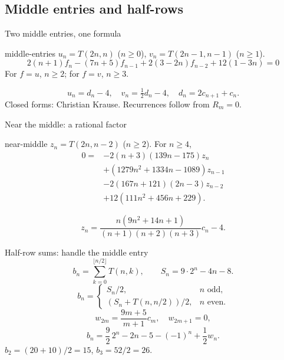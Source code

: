\documentclass{beamer}
\begin{document}
\subsection{Middle entries and half-rows}
\begin{frame}{Two middle entries, one formula}
\small
\begin{bookresult}{middle-entries}
$u_n=T(2n,n)$ ($n\ge0$), $v_n=T(2n-1,n-1)$ ($n\ge1$).
\[
2(n+1)f_n-(7n+5)f_{n-1}+2(3-2n)f_{n-2}+12(1-3n)=0
\]
For $f=u$, $n\ge2$; for $f=v$, $n\ge3$.
\end{bookresult}
\[
u_n=d_n-4,\quad v_n=\tfrac12d_n-4,\quad d_n=2c_{n+1}+c_n.
\]
Closed forms: Christian Krause. Recurrences follow from $R_m=0$.
\end{frame}
\begin{frame}{Near the middle: a rational factor}
\small
\begin{bookresult}{near-middle}
$z_n=T(2n,n-2)$ ($n\ge2$). For $n\ge4$,
\[
\begin{aligned}
0={}&-2(n+3)(139n-175)z_n\\
&+(1279n^2+1334n-1089)z_{n-1}\\
&-2(167n+121)(2n-3)z_{n-2}\\
&+12(111n^2+456n+229).
\end{aligned}
\]
\end{bookresult}
\[
z_n=\frac{n(9n^2+14n+1)}{(n+1)(n+2)(n+3)}c_n-4.
\]
\end{frame}
\begin{frame}{Half-row sums: handle the middle entry}
\small
\[
b_n=\sum_{k=0}^{\lfloor n/2\rfloor}T(n,k),\qquad S_n=9\cdot2^n-4n-8.
\]
\[
b_n=\begin{cases}S_n/2,&n\text{ odd},\\(S_n+T(n,n/2))/2,&n\text{ even}.\end{cases}
\]
\[
w_{2m}=\frac{9m+5}{m+1}c_m,\quad w_{2m+1}=0,
\]
\[
b_n=\frac92\,2^n-2n-5-(-1)^n+\frac12w_n.
\]
$ b_2=(20+10)/2=15$, $b_3=52/2=26$.
\end{frame}
\end{document}
